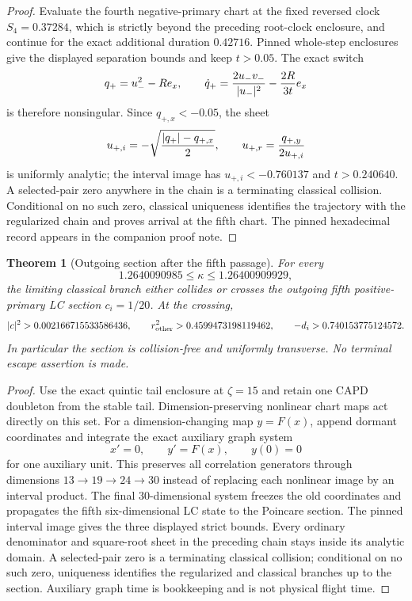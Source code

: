 \documentclass[11pt]{article}
\newtheorem{theorem}{Theorem}
\begin{document}
\begin{proof}
Evaluate the fourth negative-primary chart at the fixed reversed clock
$S_4=0.37284$, which is strictly beyond the preceding root-clock enclosure,
and continue for the exact additional duration $0.42716$.  Pinned whole-step
enclosures give the displayed separation bounds and keep $t>0.05$.  The exact
switch
\[
 q_+=u_-^2-Re_x,\qquad
 \dot q_+={2u_-v_-\over|u_-|^2}-{2R\over3t}e_x
\]
is therefore nonsingular.  Since $q_{+,x}<-0.05$, the sheet
\[
 u_{+,i}=-\sqrt{{|q_+|-q_{+,x}\over2}},\qquad
 u_{+,r}={q_{+,y}\over2u_{+,i}}
\]
is uniformly analytic; the interval image has
$u_{+,i}<-0.760137$ and $t>0.240640$.  A selected-pair zero anywhere in the
chain is a terminating classical collision.  Conditional on no such zero,
classical uniqueness identifies the trajectory with the regularized chain
and proves arrival at the fifth chart.  The pinned hexadecimal record appears
in the companion proof note.
\end{proof}

\begin{theorem}[Outgoing section after the fifth passage]
For every
\[
 1.2640090985\le\kappa\le1.26400909929,
\]
the limiting classical branch either collides or crosses the outgoing fifth
positive-primary LC section $c_i=1/20$.  At the crossing,
\[
 |c|^2>0.002166715533586436,
 \qquad r_{\rm other}^2>0.4599473198119462,
 \qquad -d_i>0.740153775124572.
\]
In particular the section is collision-free and uniformly transverse.  No
terminal escape assertion is made.
\end{theorem}

\begin{proof}
Use the exact quintic tail enclosure at $\zeta=15$ and retain one CAPD
doubleton from the stable tail.  Dimension-preserving nonlinear chart maps
act directly on this set.  For a dimension-changing map $y=F(x)$, append
dormant coordinates and integrate the exact auxiliary graph system
\[
 x'=0,\qquad y'=F(x),\qquad y(0)=0
\]
for one auxiliary unit.  This preserves all correlation generators through
dimensions $13\to19\to24\to30$ instead of replacing each nonlinear image by
an interval product.  The final 30-dimensional system freezes the old
coordinates and propagates the fifth six-dimensional LC state to the
Poincare section.  The pinned interval image gives the three displayed strict
bounds.  Every ordinary denominator and square-root sheet in the preceding
chain stays inside its analytic domain.  A selected-pair zero is a terminating
classical collision; conditional on no such zero, uniqueness identifies the
regularized and classical branches up to the section.  Auxiliary graph time
is bookkeeping and is not physical flight time.
\end{proof}
\end{document}
